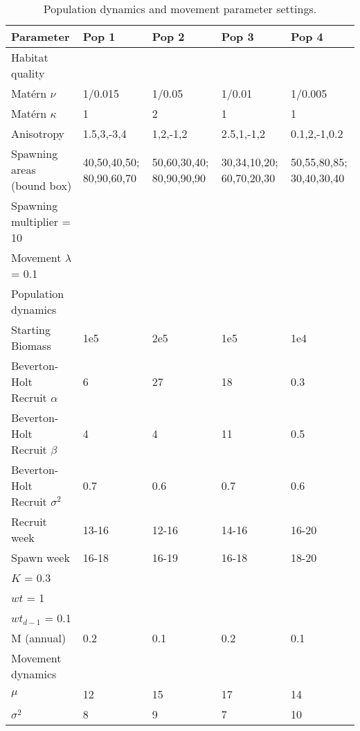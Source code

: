 \begin{table}[!ht]
\caption{Population dynamics and movement parameter settings.}
	\begin{tabular}{ p{4cm } p{2cm} p{2cm} p{2cm} p{2cm}}
	Parameter & Pop 1 & Pop 2 & Pop 3 & Pop 4 \\
	\hline
	Habitat quality & & & \\
	\hline
	Matérn $\nu$ & 1/0.015 & 1/0.05 & 1/0.01 & 1/0.005  \\
	Matérn $\kappa$ & 1 & 2 & 1 & 1  \\
	Anisotropy & 1.5,3,-3,4 & 1,2,-1,2 & 2.5,1,-1,2 & 0.1,2,-1,0.2 \\
	Spawning areas (bound box) & 40,50,40,50; 80,90,60,70 &
	50,60,30,40; 80,90,90,90 & 30,34,10,20; 60,70,20,30 & 50,55,80,85; 30,40,30,40 \\
	Spawning multiplier = 10 & & & & \\
	Movement $\lambda$ = 0.1 & & & & \\
	\hline
	Population dynamics & & & & \\
	\hline
	Starting Biomass & 1e5 & 2e5 & 1e5 & 1e4 \\
	Beverton-Holt Recruit $\alpha$ & 6 & 27 & 18 & 0.3  \\
	Beverton-Holt Recruit $\beta$ & 4 & 4 & 11 & 0.5 \\
	Beverton-Holt Recruit $\sigma^2$ & 0.7 & 0.6 & 0.7 & 0.6 \\
	Recruit week & 13-16 & 12-16 & 14-16 & 16-20 \\
	Spawn week & 16-18 & 16-19 & 16-18 & 18-20 \\
	$K$ = 0.3 & & & & \\
	$wt$ = 1 & & & & \\
	$wt_{d-1}$ = 0.1 & & & &  \\
	M (annual) & 0.2 & 0.1 & 0.2 & 0.1 \\
	\hline
	Movement dynamics & & & & \\
	\hline
	$\mu$ & 12 & 15 & 17 & 14 \\
	$\sigma^2$ & 8 & 9 & 7 & 10 \\
	\hline
\end{tabular}
\label{tab:1}
\end{table}

